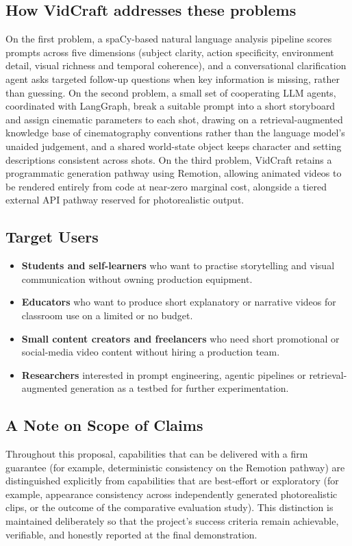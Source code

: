 \documentclass[11pt,a4paper]{article}
\begin{document}
\subsection*{How VidCraft addresses these problems}
On the first problem, a spaCy-based natural language analysis pipeline scores prompts across five dimensions (subject clarity, action specificity, environment detail, visual richness and temporal coherence), and a conversational clarification agent asks targeted follow-up questions when key information is missing, rather than guessing. On the second problem, a small set of cooperating LLM agents, coordinated with LangGraph, break a suitable prompt into a short storyboard and assign cinematic parameters to each shot, drawing on a retrieval-augmented knowledge base of cinematography conventions rather than the language model's unaided judgement, and a shared world-state object keeps character and setting descriptions consistent across shots. On the third problem, VidCraft retains a programmatic generation pathway using Remotion, allowing animated videos to be rendered entirely from code at near-zero marginal cost, alongside a tiered external API pathway reserved for photorealistic output.

\subsection*{Target Users}
\begin{itemize}[leftmargin=*]
\item \textbf{Students and self-learners} who want to practise storytelling and visual communication without owning production equipment.
\item \textbf{Educators} who want to produce short explanatory or narrative videos for classroom use on a limited or no budget.
\item \textbf{Small content creators and freelancers} who need short promotional or social-media video content without hiring a production team.
\item \textbf{Researchers} interested in prompt engineering, agentic pipelines or retrieval-augmented generation as a testbed for further experimentation.
\end{itemize}

\subsection*{A Note on Scope of Claims}
Throughout this proposal, capabilities that can be delivered with a firm guarantee (for example, deterministic consistency on the Remotion pathway) are distinguished explicitly from capabilities that are best-effort or exploratory (for example, appearance consistency across independently generated photorealistic clips, or the outcome of the comparative evaluation study). This distinction is maintained deliberately so that the project's success criteria remain achievable, verifiable, and honestly reported at the final demonstration.
\end{document}
